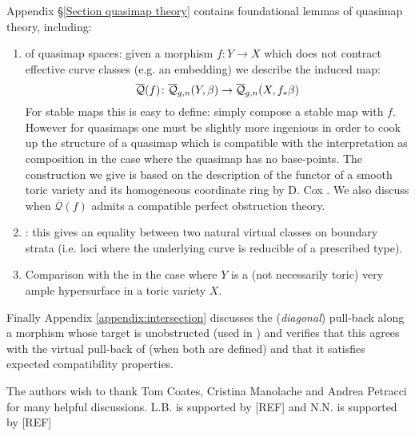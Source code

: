 Appendix \S \ref{Section quasimap theory} contains foundational lemmas of quasimap theory, including:
\begin{enumerate}
\item {} of quasimap spaces: given a morphism $f\colon Y\to X$ which does not contract effective curve classes (e.g. an embedding) we describe the induced map:
\begin{equation*} \overline{\mathcal{Q}}(f)\colon\overline{\mathcal Q}_{g,n}(Y,\beta)\rightarrow\overline{\mathcal Q}_{g,n}(X,f_*\beta) \end{equation*}
For stable maps this is easy to define: simply compose a stable map with $f$. However for quasimaps one must be slightly more ingenious in order to cook up the structure of a quasimap which is compatible with the interpretation as composition in the case where the quasimap has no base-points. The construction we give is based on the description of the functor of a smooth toric variety and its homogeneous coordinate ring by D. Cox \cite{CoxFunctor}\cite{CoxRing}. We also discuss when $\overline{\mathcal{Q}}(f)$ admits a compatible perfect obstruction theory.
\item {}: this gives an equality between two natural virtual classes on boundary strata (i.e. loci where the underlying curve is reducible of a prescribed type).
\item Comparison with the  \cite{CFKM} in the case where $Y$ is a (not necessarily toric) very ample hypersurface in a toric variety $X$.
\end{enumerate}

Finally Appendix \ref{appendix:intersection} discusses the (\emph{diagonal}) pull-back along a morphism whose target is unobstructed (used in \cite{Ga}) and verifies that this agrees with the virtual pull-back of \cite{Manolache-Pull} (when both are defined) and that it satisfies expected compatibility properties.


\begin{acknowledgements} The authors wish to thank Tom Coates, Cristina Manolache and Andrea Petracci for many helpful discussions. L.B. is supported by [REF] and N.N. is supported by [REF]
\end{acknowledgements}

